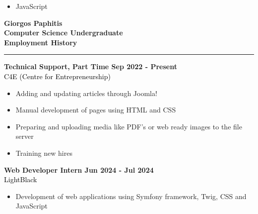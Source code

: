 \documentclass[12pt]{article}
\begin{document}
\begin{paracol}{2}
\begin{tcolorbox}[colback=bgcolor, colframe=bgcolor, boxrule=0pt, arc=0pt, outer arc=0pt, left=10pt, right=8pt, top=20pt, bottom=10pt,height=\textheight]
{\begin{itemize}[leftmargin=15pt, itemsep=0pt, topsep=0pt]
         \item JavaScript\\
      \end{itemize}
      }
   \end{tcolorbox}
   \switchcolumn
   \vspace*{1.5cm}
   \textbf{\Huge \textcolor{bgcolor}{Giorgos Paphitis}}\\[0.5em]
   \textbf{Computer Science Undergraduate}\\
   \vspace{1.5cm}
   {\fontsize{14pt}{13pt}\selectfont
   \textbf{\textcolor{bgcolor}{Employment History}}\\[0.3em]
   }
   \hrule
   \vspace{0.5cm}
   \textbf{\textcolor{bgcolor}{Technical Support, Part Time \hfill Sep 2022 - Present}}\\[0.5em]
   \textcolor{black}{C4E (Centre for Entrepreneurship)}\\[0.5em]
   {\renewcommand{\labelitemi}{\textcolor{bgcolor}{\normalsize$\bullet$}}%
   \begin{itemize}[leftmargin=13pt, itemsep=0pt, topsep=0pt]
         \item Adding and updating articles through Joomla!\\
         \item Manual development of pages using HTML and CSS\\
         \item Preparing and uploading media like PDF's or web ready images to the file server\\
         \item Training new hires\\
      \end{itemize}
   }
   \vspace{0.5cm}
   \textbf{\textcolor{bgcolor}{Web Developer Intern \hfill Jun 2024 - Jul 2024}}\\[0.5em]
   \textcolor{black}{LightBlack}\\[0.5em]
   {\renewcommand{\labelitemi}{\textcolor{bgcolor}{\normalsize$\bullet$}}%
   \begin{itemize}[leftmargin=13pt, itemsep=0pt, topsep=0pt]
         \item Development of web applications using Symfony framework, Twig, CSS and JavaScript\\

\end{itemize}}
\end{paracol}
\end{document}
